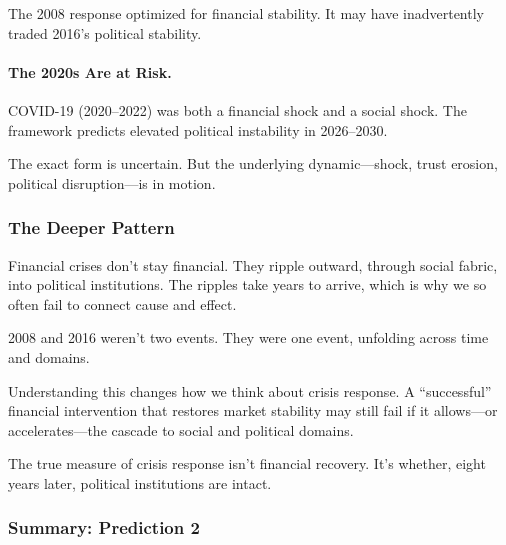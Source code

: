 The 2008 response optimized for financial stability. It may have 
inadvertently traded 2016's political stability.

\paragraph{The 2020s Are at Risk.}

COVID-19 (2020--2022) was both a financial shock and a social shock. 
The framework predicts elevated political instability in 2026--2030.

The exact form is uncertain. But the underlying dynamic---shock, 
trust erosion, political disruption---is in motion.

\subsubsection{The Deeper Pattern}

Financial crises don't stay financial. They ripple outward, through 
social fabric, into political institutions. The ripples take years 
to arrive, which is why we so often fail to connect cause and effect.

2008 and 2016 weren't two events. They were one event, unfolding 
across time and domains.

Understanding this changes how we think about crisis response. 
A ``successful'' financial intervention that restores market stability 
may still fail if it allows---or accelerates---the cascade to social 
and political domains.

The true measure of crisis response isn't financial recovery. 
It's whether, eight years later, political institutions are intact.

\subsubsection{Summary: Prediction 2}

